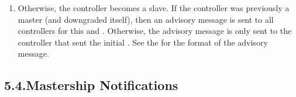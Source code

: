 \documentclass[11pt]{article}
\begin{document}
{\begin{enumerate}
\begin{enumerate}
\begin{enumerate}
\item{}
The server now accepts the current controller as the new master, thus
accepting  requests from this controller. The server updates
the highest election ID (i.e. ) it has seen for
this  and  to .%

\item{}
The server notifies the new master by sending the advisory message
described in the~.%
\end{enumerate}%
\end{enumerate}%

\item{}
Otherwise, the controller becomes a slave. If the controller was previously a
master (and downgraded itself), then an advisory message is sent to all
controllers for this  and .  Otherwise, the advisory
message is only sent to the controller that sent the initial
.  See the
 for the format of the
advisory message.%
\end{enumerate}%

\subsection{5.4.\hspace*{0.5em}Mastership Notifications}\label{sec-mastership-notification}%

}
\end{document}
